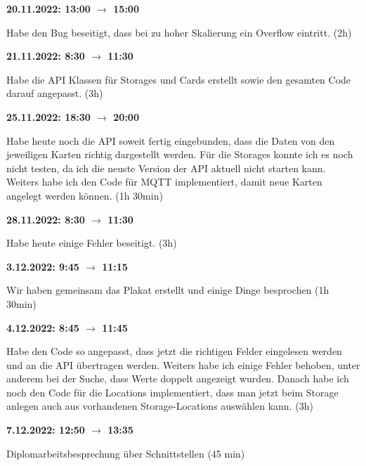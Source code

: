 \vspace{0.5cm}

\textbf{20.11.2022: 13:00 $\rightarrow$ 15:00} \

Habe den Bug beseitigt, dass bei zu hoher Skalierung ein Overflow eintritt. (2h)

\vspace{0.5cm}

\textbf{21.11.2022: 8:30 $\rightarrow$ 11:30} \

Habe die API Klassen für Storages und Cards erstellt sowie den gesamten Code darauf angepasst. (3h)

\vspace{0.5cm}

\textbf{25.11.2022: 18:30 $\rightarrow$ 20:00} \

Habe heute noch die API soweit fertig eingebunden, dass die Daten von den jeweiligen Karten richtig dargestellt werden. Für die Storages konnte ich es noch nicht testen, da ich die neuste Version der API aktuell nicht starten kann. Weiters habe ich den Code für MQTT implementiert, damit neue Karten angelegt werden können. (1h 30min)

\vspace{0.5cm}

\textbf{28.11.2022: 8:30 $\rightarrow$ 11:30} \

Habe heute einige Fehler beseitigt. (3h)

\vspace{0.5cm}

\textbf{3.12.2022: 9:45 $\rightarrow$ 11:15} \

Wir haben gemeinsam das Plakat erstellt und einige Dinge besprochen (1h 30min)

\vspace{0.5cm}

\textbf{4.12.2022: 8:45 $\rightarrow$ 11:45} \

Habe den Code so angepasst, dass jetzt die richtigen Felder eingelesen werden und an die API übertragen werden. Weiters habe ich einige Fehler behoben, unter anderem bei der Suche, dass Werte doppelt angezeigt wurden. Danach habe ich noch den Code für die Locations implementiert, dass man jetzt beim Storage anlegen auch aus vorhandenen Storage-Locations auswählen kann. (3h)

\vspace{0.5cm}

\textbf{7.12.2022: 12:50 $\rightarrow$ 13:35} \

Diplomarbeitsbesprechung über Schnittstellen (45 min)

